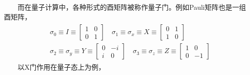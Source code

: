 \documentclass[a4paper,11pt,english]{sphinxmanual}
\begin{document}
\sphinxAtStartPar
  而在量子计算中，各种形式的酉矩阵被称作量子门。例如Pauli矩阵也是一组酉矩阵，
\begin{equation*}
\begin{split}\begin{aligned} &\sigma_{0} \equiv I \equiv\left[\begin{array}{ll} 1 & 0 \\ 0 & 1 \end{array}\right] \quad \sigma_{1} \equiv \sigma_{x} \equiv X \equiv\left[\begin{array}{ll} 0 & 1 \\ 1 & 0 \end{array}\right] \\ &\sigma_{2} \equiv \sigma_{y} \equiv Y \equiv\left[\begin{array}{cc} 0 & -i \\ i & 0 \end{array}\right] \quad \sigma_{3} \equiv \sigma_{z} \equiv Z \equiv\left[\begin{array}{cc} 1 & 0 \\ 0 & -1 \end{array}\right] \end{aligned}\end{split}
\end{equation*}
\sphinxAtStartPar
  以X门作用在量子态上为例，
\end{document}
